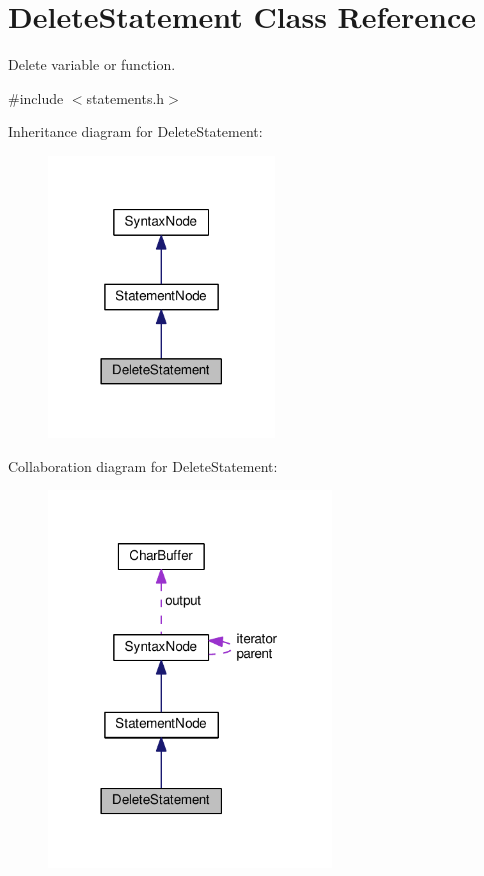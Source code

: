 \hypertarget{classDeleteStatement}{}\section{Delete\+Statement Class Reference}
\label{classDeleteStatement}


Delete variable or function.  




{\ttfamily \#include $<$statements.\+h$>$}



Inheritance diagram for Delete\+Statement\+:\nopagebreak
\begin{figure}[H]
\begin{center}
\leavevmode
\includegraphics[width=170pt]{classDeleteStatement__inherit__graph}
\end{center}
\end{figure}


Collaboration diagram for Delete\+Statement\+:\nopagebreak
\begin{figure}[H]
\begin{center}
\leavevmode
\includegraphics[width=213pt]{classDeleteStatement__coll__graph}
\end{center}
\end{figure}
